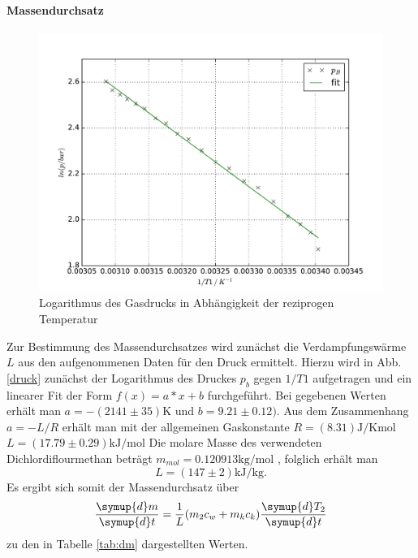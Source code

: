 \paragraph{Massendurchsatz}

\begin{figure}
  \centering
  \includegraphics[width = \textwidth]{./Plots/Druck.pdf}
  \caption{Logarithmus des Gasdrucks in Abhängigkeit der reziprogen Temperatur}
  \label{fig:druck}
\end{figure}

Zur Bestimmung des Massendurchsatzes wird zunächst die Verdampfungswärme $L$ aus den aufgenommenen Daten für den Druck ermittelt. Hierzu wird in Abb. \ref{druck} zunächst der Logarithmus des Druckes $p_b$ gegen $1/T1$ aufgetragen und ein linearer Fit der Form $f(x) = a*x+b$ furchgeführt. Bei gegebenen Werten erhält man $a = -(2141 \pm 35) \si{\kelvin}$ und $b = 9.21 \pm 0.12)$. Aus dem Zusammenhang $a = -L/R$ erhält man mit der allgemeinen Gaskonstante $R = (8.31)\si{\joule \per \kelvin \mol} $ \cite{Gaskonstante} $L=(17.79 \pm 0.29) \si{\kilo \joule \per \mol}$ Die molare Masse des verwendeten Dichlordiflourmethan beträgt $m_{mol} = 0.120913 \si{\kilo \gram \per \mol}$ \cite{Gas}, folglich erhält man
\begin{equation}
  L=(147\pm 2) \si{\kilo \joule \per \kilo \gram}.
  \label{eqn:L}
\end{equation}
Es ergibt sich somit der Massendurchsatz über
\begin{equation}
  \frac{\symup{d}m}{\symup{d}t} = \frac{1}{L}(m_2 c_w + m_k c_k) \frac{\symup{d}T_2}{\symup{d}t}
\end{equation}
zu den in Tabelle \ref{tab:dm} dargestellten Werten.

